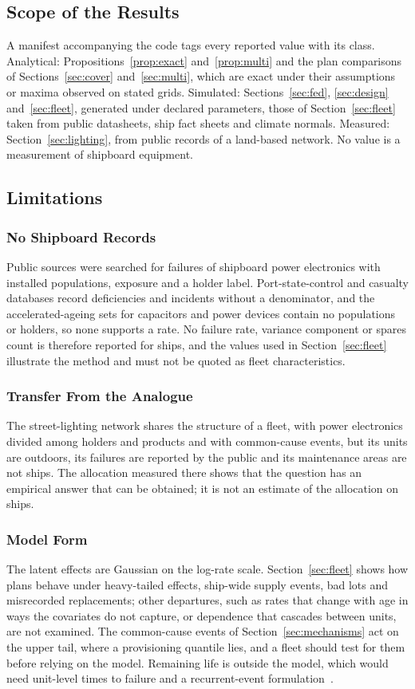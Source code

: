 \subsection{Scope of the Results}
A manifest accompanying the code tags every reported value with its class.
Analytical: Propositions~\ref{prop:exact}
and~\ref{prop:multi} and the plan comparisons of Sections~\ref{sec:cover}
and~\ref{sec:multi}, which are exact under their assumptions or maxima observed
on stated grids. Simulated: Sections~\ref{sec:fed}, \ref{sec:design}
and~\ref{sec:fleet}, generated under declared parameters, those of
Section~\ref{sec:fleet} taken from public datasheets, ship fact sheets and
climate normals. Measured: Section~\ref{sec:lighting}, from public records of
a land-based network. No value is a measurement of shipboard equipment.

\subsection{Limitations}
\subsubsection{No Shipboard Records}
Public sources were searched for failures of shipboard power electronics with
installed populations, exposure and a holder label. Port-state-control and
casualty databases record deficiencies and incidents without a denominator,
and the accelerated-ageing sets for capacitors and power devices contain no
populations or holders, so none supports a rate. No failure rate, variance
component or spares count is therefore reported for ships, and the values used
in Section~\ref{sec:fleet} illustrate the method and must not be quoted as fleet
characteristics.

\subsubsection{Transfer From the Analogue}
The street-lighting network shares the structure of a fleet, with power
electronics divided among holders and products and with common-cause events,
but its units are outdoors, its failures are reported by the public and its
maintenance areas are not ships. The allocation measured there shows that the
question has an empirical answer that can be obtained; it is not an estimate of
the allocation on ships.

\subsubsection{Model Form}
The latent effects are Gaussian on the log-rate scale. Section~\ref{sec:fleet}
shows how plans behave under heavy-tailed effects, ship-wide supply events, bad
lots and misrecorded replacements; other departures, such as rates that change
with age in ways the covariates do not capture, or dependence that cascades
between units, are not examined. The common-cause events of
Section~\ref{sec:mechanisms} act on the upper tail, where a provisioning quantile
lies, and a fleet should test for them before relying on the model. Remaining
life is outside the model, which would need unit-level times to failure and a
recurrent-event formulation~\cite{meeker2022,lindqvist2006}.

